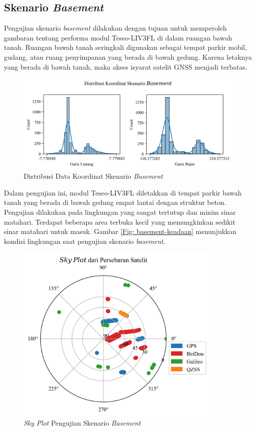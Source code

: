 \subsection{Skenario \textit{Basement}}
Pengujian skenario \textit{basement} dilakukan dengan tujuan untuk memperoleh gambaran tentang performa modul Teseo-LIV3FL di dalam ruangan bawah tanah. Ruangan bawah tanah seringkali digunakan sebagai tempat parkir mobil, gudang, atau ruang penyimpanan yang berada di bawah gedung. Karena letaknya yang berada di bawah tanah, maka akses isyarat satelit GNSS menjadi terbatas.

\begin{figure}[H]
	\centering
	\begin{adjustbox}{width=\textwidth}
		\includegraphics{contents/chapter-4/1-skenario-basement/distribution.png}
	\end{adjustbox}
	\caption{Distribusi Data Koordinat Skenario \textit{Basement}}
	\label{Fig:basement-distribution}
\end{figure}

Dalam pengujian ini, modul Teseo-LIV3FL diletakkan di tempat parkir bawah tanah yang berada di bawah gedung empat lantai dengan struktur beton. Pengujian dilakukan pada lingkungan yang sangat tertutup dan minim sinar matahari. Terdapat beberapa area terbuka kecil yang memungkinkan sedikit sinar matahari untuk masuk. Gambar \ref{Fig: basement-keadaan} menunjukkan kondisi lingkungan saat pengujian skenario \textit{basement}.

\begin{figure}[H]
	\centering
	\includegraphics[width=10cm]{contents/chapter-4/1-skenario-basement/sky_plot.png}
	\caption{\textit{Sky Plot} Pengujian Skenario \textit{Basement}}
	\label{Fig: basement-skyplot}
\end{figure}


